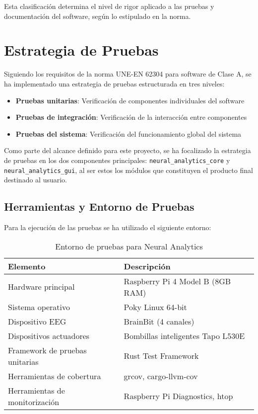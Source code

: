 Esta clasificación determina el nivel de rigor aplicado a las pruebas y documentación del software, según lo estipulado en la norma.

\section{Estrategia de Pruebas}

Siguiendo los requisitos de la norma UNE-EN 62304 para software de Clase A, se ha implementado una estrategia de pruebas estructurada en tres niveles:

\begin{itemize}
    \item \textbf{Pruebas unitarias}: Verificación de componentes individuales del software
    \item \textbf{Pruebas de integración}: Verificación de la interacción entre componentes
    \item \textbf{Pruebas del sistema}: Verificación del funcionamiento global del sistema
\end{itemize}

Como parte del alcance definido para este proyecto, se ha focalizado la estrategia de pruebas en los dos componentes principales: \texttt{neural\_analytics\_core} y \texttt{neural\_analytics\_gui}, al ser estos los módulos que constituyen el producto final destinado al usuario.

\subsection{Herramientas y Entorno de Pruebas}

Para la ejecución de las pruebas se ha utilizado el siguiente entorno:

\begin{table}[ht]
    \centering
    \begin{tabular}{|l|l|}
        \hline
        \textbf{Elemento} & \textbf{Descripción} \\
        \hline
        Hardware principal & Raspberry Pi 4 Model B (8GB RAM) \\
        \hline
        Sistema operativo & Poky Linux 64-bit \\
        \hline
        Dispositivo EEG & BrainBit (4 canales) \\
        \hline
        Dispositivos actuadores & Bombillas inteligentes Tapo L530E \\
        \hline
        Framework de pruebas unitarias & Rust Test Framework \\
        \hline
        Herramientas de cobertura & grcov, cargo-llvm-cov \\
        \hline
        Herramientas de monitorización & Raspberry Pi Diagnostics, htop \\
        \hline
    \end{tabular}
    \caption{Entorno de pruebas para Neural Analytics}
    \label{tab:test_environment}
\end{table}


